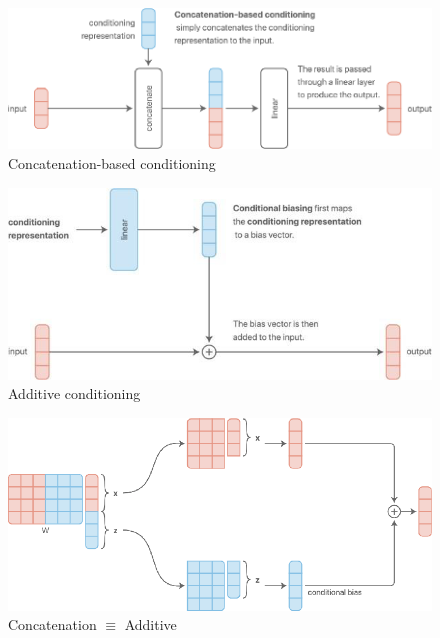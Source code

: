 \begin{minipage}{.33\linewidth}
    \begin{figure}[H]
        \centering
        \includegraphics[width=0.95\linewidth]{images/mm-multitask-sol3}
        \caption[Concatenation-based conditioning]{Concatenation-based conditioning}
        \label{fig:mm-multitask-sol3}
    \end{figure}
\end{minipage}
\begin{minipage}{.33\linewidth}
    \begin{figure}[H]
        \centering
        \includegraphics[width=0.95\linewidth]{images/mm-multitask-sol4}
        \caption[Additive conditioning]{Additive conditioning}
        \label{fig:mm-multitask-sol4}
    \end{figure}
\end{minipage}
\begin{minipage}{.33\linewidth}
    \begin{figure}[H]
        \centering
        \includegraphics[width=0.95\linewidth]{images/mm-multitask-sol5}
        \caption[Concatenation $\equiv$ Additive]{Concatenation $\equiv$ Additive}
        \label{fig:mm-multitask-sol5}
    \end{figure}
\end{minipage}

